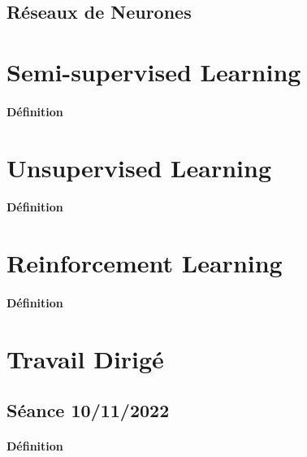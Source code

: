 \documentclass{article}
\begin{document}
\subsection{Réseaux de Neurones}


\section{Semi-supervised Learning}
\paragraph{Définition}

\section{Unsupervised Learning}
\paragraph{Définition}

\section{Reinforcement Learning}
\paragraph{Définition}


\section{Travail Dirigé}
\subsection{Séance 10/11/2022}
\paragraph{Définition}
\end{document}
